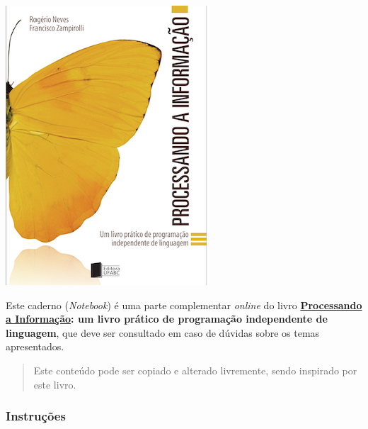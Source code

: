 \documentclass[12pt,a4paper]{article}
\begin{document}
    \includegraphics{"figs/Capa_Processando_Informacao.jpg"}

Este caderno (\emph{Notebook}) é uma parte complementar \emph{online} do
livro
\textbf{\href{https://editora.ufabc.edu.br/matematica-e-ciencias-da-computacao/58-processando-a-informacao}{Processando
a Informação}: um livro prático de programação independente de
linguagem}, que deve ser consultado em caso de dúvidas sobre os temas
apresentados.

\begin{quote}
Este conteúdo pode ser copiado e alterado livremente, sendo inspirado
por este livro.
\end{quote}

    \hypertarget{instruuxe7uxf5es}{%
\subsubsection{Instruções}\label{instruuxe7uxf5es}}
\end{document}
